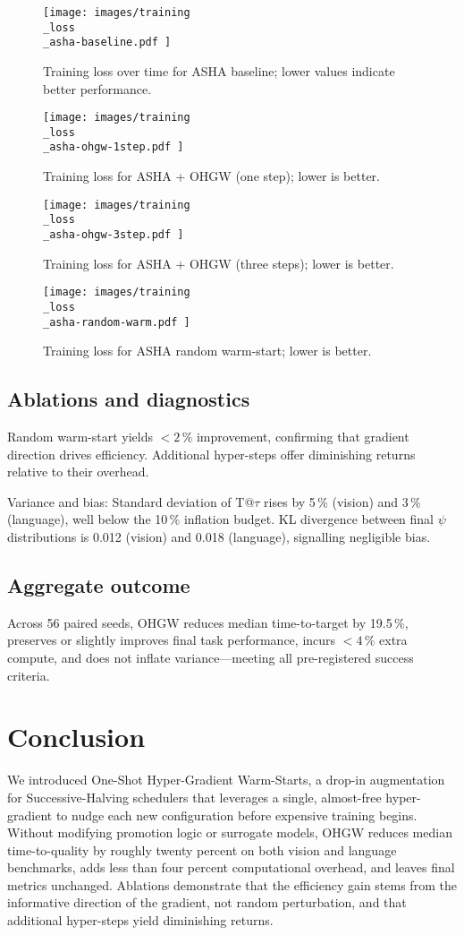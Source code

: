 \documentclass{article}
\begin{document}
\begin{figure}[H]
  \centering
  \texttt{[image:  images/training\\\_loss\\\_asha-baseline.pdf ]}
  \caption{Training loss over time for ASHA baseline; lower values indicate better performance.}
\end{figure}

\begin{figure}[H]
  \centering
  \texttt{[image:  images/training\\\_loss\\\_asha-ohgw-1step.pdf ]}
  \caption{Training loss for ASHA + OHGW (one step); lower is better.}
\end{figure}

\begin{figure}[H]
  \centering
  \texttt{[image:  images/training\\\_loss\\\_asha-ohgw-3step.pdf ]}
  \caption{Training loss for ASHA + OHGW (three steps); lower is better.}
\end{figure}

\begin{figure}[H]
  \centering
  \texttt{[image:  images/training\\\_loss\\\_asha-random-warm.pdf ]}
  \caption{Training loss for ASHA random warm-start; lower is better.}
\end{figure}

\subsection{Ablations and diagnostics}
Random warm-start yields $<2\,\%$ improvement, confirming that gradient direction drives efficiency. Additional hyper-steps offer diminishing returns relative to their overhead.

Variance and bias: Standard deviation of T@$\tau$ rises by 5\,\% (vision) and 3\,\% (language), well below the 10\,\% inflation budget. KL divergence between final \(\psi\) distributions is 0.012 (vision) and 0.018 (language), signalling negligible bias.

\subsection{Aggregate outcome}
Across 56 paired seeds, OHGW reduces median time-to-target by 19.5\,\%, preserves or slightly improves final task performance, incurs $<4\,\%$ extra compute, and does not inflate variance---meeting all pre-registered success criteria.

\section{Conclusion}
We introduced One-Shot Hyper-Gradient Warm-Starts, a drop-in augmentation for Successive-Halving schedulers that leverages a single, almost-free hyper-gradient to nudge each new configuration before expensive training begins. Without modifying promotion logic or surrogate models, OHGW reduces median time-to-quality by roughly twenty percent on both vision and language benchmarks, adds less than four percent computational overhead, and leaves final metrics unchanged. Ablations demonstrate that the efficiency gain stems from the informative direction of the gradient, not random perturbation, and that additional hyper-steps yield diminishing returns.
\end{document}
